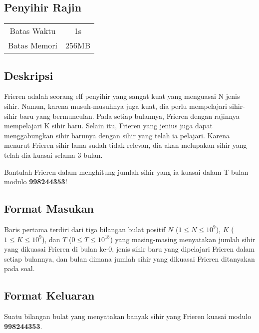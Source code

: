 \documentclass{article}
\begin{document}
\begin{center}

    
    \section*{Penyihir Rajin} %

    \begin{tabular}{ | c c | }
        \hline
        Batas Waktu  & 1s \\    %
        Batas Memori & 256MB \\  %
        \hline
    \end{tabular}
\end{center}

\subsection*{Deskripsi}

Frieren adalah seorang elf penyihir yang sangat kuat yang menguasai N jenis sihir. Namun, karena musuh-musuhnya juga kuat, dia perlu mempelajari sihir-sihir baru yang bermunculan. Pada setiap bulannya, Frieren dengan rajinnya mempelajari K sihir baru. Selain itu, Frieren yang jenius juga dapat menggabungkan sihir barunya dengan sihir yang telah ia pelajari. Karena menurut Frieren sihir lama sudah tidak relevan, dia akan melupakan sihir yang telah dia kuasai selama 3 bulan.

Bantulah Frieren dalam menghitung jumlah sihir yang ia kuasai dalam T bulan modulo \textbf{998244353}!

\subsection*{Format Masukan}

Baris pertama terdiri dari tiga bilangan bulat positif $N$ ($1 \leq N \leq 10^{9}$), $K$ ($1 \leq K \leq 10^{9}$), dan $T$ ($0 \leq T \leq 10^{18}$) yang masing-masing menyatakan jumlah sihir yang dikuasai Frieren di bulan ke-0, jenis sihir baru yang dipelajari Frieren dalam setiap bulannya, dan bulan dimana jumlah sihir yang dikuasai Frieren ditanyakan pada soal.


\subsection*{Format Keluaran}

Suatu bilangan bulat yang menyatakan banyak sihir yang Frieren kuasai modulo \textbf{998244353}.
\end{document}
